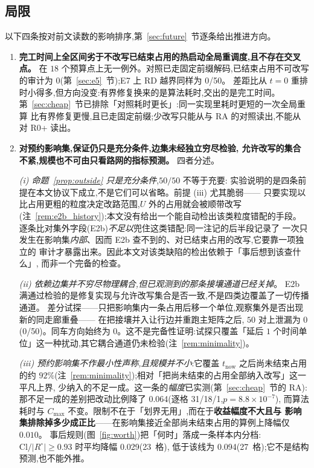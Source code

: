 \documentclass[manuscript,screen,review]{acmart}
\newcommand{\NPairs}{50}
\newcommand{\PassInvar}{\NPairs/\NPairs}     %
\newcommand{\RzeroPastLo}{0}
\newcommand{\ClosureAliveFrac}{92\%}
\newcommand{\RedecodeBad}{0/\NPairs}
\newcommand{\RAStabWTL}{31/18/1}     %
\newcommand{\RAStabP}{8.8\times10^{-7}}  %
\newcommand{\RAStabMean}{0.064}      %
\newcommand{\WorthThresh}{0.93}
\newcommand{\WorthLowN}{27}
\newcommand{\WorthLowMean}{0.094}
\newcommand{\WorthHighN}{23}
\newcommand{\WorthHighMean}{0.029}
\newcommand{\ProbeLeakPairs}{0/50}
\newcommand{\ProbeLeaks}{0}
\begin{document}
\subsection{局限}
\label{sec:limitations}

以下四条按对前文读数的影响排序,第~\ref{sec:future}~节逐条给出推进方向。

\begin{enumerate}[leftmargin=1.6em,itemsep=0.35em]
\item \textbf{完工时间上全区间劣于不改写已结束占用的热启动全局重调度,且不存在交叉点。}
在 \(18\) 个预算点上无一例外。对照已走固定前缀解码,已结束占用不可改写的审计为
\(\RzeroPastLo\)(第~\ref{sec:e5}~节);E7 上 RD 越界同样为 \RedecodeBad。
差距比从 \(t=0\) 重排时小得多,但方向没变:有界修复换来的是算法耗时,交出的是完工时间。
第~\ref{sec:cheap}~节已排除「对照耗时更长」:同一实现里耗时更短的一次全局重算
比有界修复更慢,且已走固定前缀;少改写只能从与 RA 的对照读出,不能从对 R0+ 读出。

\item \textbf{对预约影响集,保证仍只是充分条件,边集未经独立穷尽检验,
允许改写的集合不紧,规模也不可由只看路网的指标预测。} 四者分述。

\emph{(i) 命题~\ref{prop:outside} 只是充分条件},\(\PassInvar\) 不等于充要:
实验说明的是四条前提在本文协议下成立,不是它们可以省略。前提 (iii) 尤其脆弱——
只要实现以比占用更粗的粒度决定改路范围,\(U\) 外的占用就会被顺带改写
(注~\ref{rem:e2b_history});本文没有给出一个能自动检出该类粒度错配的手段。
逐条比对集外字段(E2b)\emph{不足以}兜住这类错配:同一注记的后半段记录了
一次只发生在影响集\emph{内部}、因而 E2b 查不到的、对已结束占用的改写,它要靠一项独立的
审计才暴露出来。因此本文对该类缺陷的检出依赖于「事后想到该查什么」,
而非一个完备的检查。

\emph{(ii) 依赖边集并不穷尽物理耦合,但已观测到的那条接壤通道已经关掉}。
E2b 满通过检验的是修复实现与允许改写集合是否一致,不是四类边覆盖了一切传播通道。
差分试探——只把影响集内一条占用后移一个单位,观察集外是否出现新的同走廊重叠——
在把接壤并入让行边并重跑主矩阵之后, \(\NPairs\) 对上泄漏为 \ProbeLeaks
(\ProbeLeakPairs)。同车方向始终为 \(0\)。这不是完备性证明:试探只覆盖「延后 \(1\)
个时间单位」这一种扰动,其它耦合通道仍未检验(注~\ref{rem:minimality})。

\emph{(iii) 预约影响集不作最小性声称,且规模并不小}:它覆盖 \(t_{\mathrm{now}}\) 之后尚未结束占用的约
\(\ClosureAliveFrac\)(注~\ref{rem:minimality});相对「把尚未结束的占用全部纳入改写」这一平凡上界,
少纳入的不足一成。这一条的\emph{幅度}已实测(第~\ref{sec:cheap}~节的 RA):
那不足一成的差别把改动比例降了 \RAStabMean(逐格 \RAStabWTL,\(p=\RAStabP\)),
而算法耗时与 \(C_{\max}\) 不变。限制不在于「划界无用」,而在于\textbf{收益幅度不大且与
影响集排除掉多少成正比}——在影响集接近全部尚未结束占用的算例上降幅仅 \(0.010\)。
事后规则(图~\ref{fig:worth})把「何时」落成一条样本内分档:
\(\mathrm{Cl}/|R^{\circ}|\ge\WorthThresh\) 时平均降幅 \WorthHighMean(\WorthHighN\ 格),
低于该线为 \WorthLowMean(\WorthLowN\ 格);它不是结构预测,也不能外推。


\end{enumerate}
\end{document}
